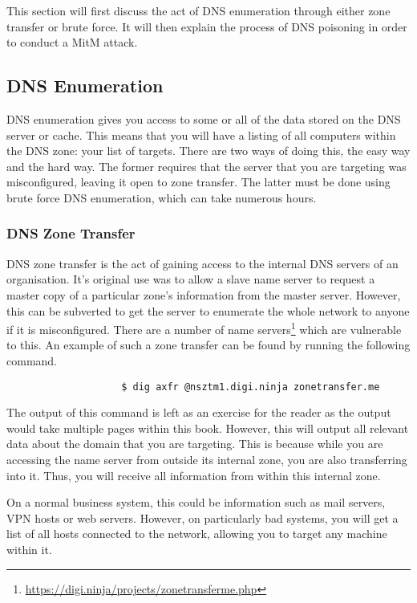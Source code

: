 		This section will first discuss the act of DNS enumeration through either zone transfer or brute force.
		It will then explain the process of DNS poisoning in order to conduct a MitM attack.

		\subsection{DNS Enumeration}
			DNS enumeration gives you access to some or all of the data stored on the DNS server or cache.
			This means that you will have a listing of all computers within the DNS zone: your list of targets.
			There are two ways of doing this, the easy way and the hard way.
			The former requires that the server that you are targeting was misconfigured, leaving it open to zone transfer.
			The latter must be done using brute force DNS enumeration, which can take numerous hours.

			\subsubsection{DNS Zone Transfer}
				DNS zone transfer is the act of gaining access to the internal DNS servers of an organisation.
				It's original use was to allow a slave name server to request a master copy of a particular zone's information from the master server.
				However, this can be subverted to get the server to enumerate the whole network to anyone if it is misconfigured.
				There are a number of name servers\footnote{\url{https://digi.ninja/projects/zonetransferme.php}} which are vulnerable to this.
				An example of such a zone transfer can be found by running the following command.
				\begin{verbatim}
					$ dig axfr @nsztm1.digi.ninja zonetransfer.me
				\end{verbatim}
				The output of this command is left as an exercise for the reader as the output would take multiple pages within this book.
				However, this will output all relevant data about the domain that you are targeting.
				This is because while you are accessing the name server from outside its internal zone, you are also transferring into it.
				Thus, you will receive all information from within this internal zone.

				On a normal business system, this could be information such as mail servers, VPN hosts or web servers.
				However, on particularly bad systems, you will get a list of all hosts connected to the network, allowing you to target any machine within it.

